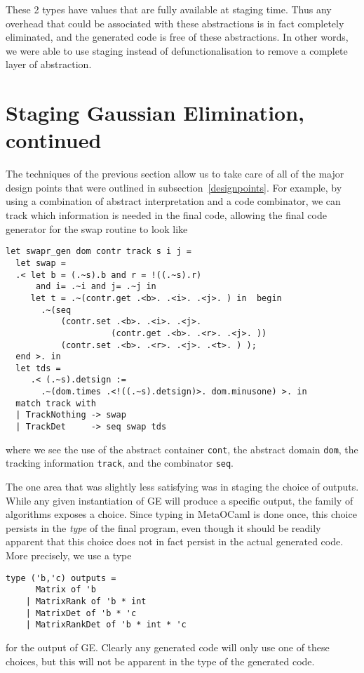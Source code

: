 \documentclass[11pt]{elsart}
\begin{document}
These 2 types have values that are fully available at staging time.  
Thus any overhead that could be associated with these abstractions 
is in fact completely eliminated, and the generated code is free
of these abstractions.  In other words, we were able to use staging
instead of defunctionalisation \cite{defunc} 
to remove a complete layer of abstraction.

\section{Staging Gaussian Elimination, continued}

The techniques of the previous section allow us to take care of all
of the major design points that were outlined in subsection~\ref{designpoints}.
For example, by using a combination of abstract interpretation and a
code combinator, we can track which information is needed in the final
code, allowing the final code generator for the swap routine to look
like
\begin{small}\begin{verbatim}
let swapr_gen dom contr track s i j =
  let swap =
  .< let b = (.~s).b and r = !((.~s).r)
      and i= .~i and j= .~j in
     let t = .~(contr.get .<b>. .<i>. .<j>. ) in  begin
       .~(seq
           (contr.set .<b>. .<i>. .<j>. 
		             (contr.get .<b>. .<r>. .<j>. ))
           (contr.set .<b>. .<r>. .<j>. .<t>. ) );
  end >. in
  let tds = 
     .< (.~s).detsign := 
	   .~(dom.times .<!((.~s).detsign)>. dom.minusone) >. in
  match track with
  | TrackNothing -> swap
  | TrackDet     -> seq swap tds
\end{verbatim}\end{small}
\noindent where we see the use of the abstract container \texttt{cont},
the abstract domain \texttt{dom}, the tracking information
\texttt{track}, and the combinator \texttt{seq}.

The one area that was slightly less satisfying was in staging the
choice of outputs.  While any given instantiation of GE will produce
a specific output, the family of algorithms exposes a choice.  Since
typing in MetaOCaml is done once, this choice persists in the
\emph{type}
of the final program, even though it should be readily apparent that
this choice does not in fact persist in the actual generated code.
More precisely, we use a type
\begin{small}\begin{verbatim}
type ('b,'c) outputs = 
      Matrix of 'b
    | MatrixRank of 'b * int
    | MatrixDet of 'b * 'c
    | MatrixRankDet of 'b * int * 'c
\end{verbatim}\end{small}
\noindent for the output of GE.  Clearly any generated code will only
use one of these choices, but this will not be apparent in the 
type of the generated code. 
\end{document}
